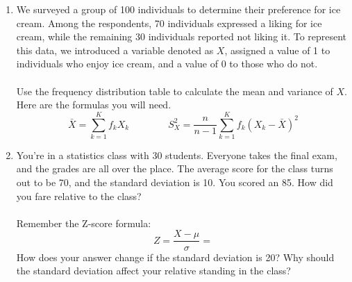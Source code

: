 \documentclass{./../handout}
\begin{document}
\thispagestyle{plain}
\begin{center}
\end{center}	

\begin{enumerate}
\item We surveyed a group of 100 individuals to determine their preference for ice cream. Among the respondents, 70 individuals expressed a liking for ice cream, while the remaining 30 individuals reported not liking it. To represent this data, we introduced a variable denoted as $X$, assigned a value of 1 to individuals who enjoy ice cream, and a value of 0 to those who do not.  \\~\\
Use the frequency distribution table to calculate the mean and variance of $X$. Here are the formulas you will need.
$$ \bar{X} = \sum_{k=1}^K f_k X_k \quad \quad \quad \quad S^2_X = \frac{n}{n-1} \sum_{k=1}^K f_k (X_k-\bar{X})^2 $$

\newpage
\item You're in a statistics class with 30 students. Everyone takes the final exam, and the grades are all over the place. The average score for the class turns out to be 70, and the standard deviation is 10. You scored an 85. How did you fare relative to the class? \\~\\
Remember the Z-score formula:
$$ Z = \frac{X-\mu}{\sigma} =  $$
How does your answer change if the standard deviation is 20? Why should the standard deviation affect your relative standing in the class?
\end{enumerate}
\end{document}
